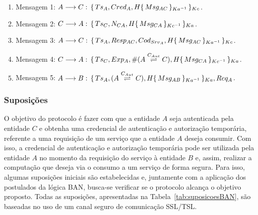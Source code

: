 \begin{enumerate}
  \item Mensagem 1: ${A}\longrightarrow{C}:\,{\{\,{Ts_A,Cred_A,H{\{\,{Msg_{AC}}\,\}_{Ka ^{-1}}}}\,\}_{Kc}}$.
  \item Mensagem 2: ${C}\longrightarrow{A}:\,{\{\,{Ts_C,{N_{CA}},H{\{\,{Msg_{CA}}\,\}_{Kc ^{-1}}}}\,\}_{Ka}}$.
  \item Mensagem 3: ${A}\longrightarrow{C}:\,{\{\,{Ts_A,{Resp_{AC}},Cod_{Srv_A},H{\{\,{Msg_{AC}}\,\}_{Ka ^{-1}}}}\,\}_{Kc}}$.
  \item Mensagem 4: ${C}\longrightarrow{A}:\,{\{\,{Ts_C,Exp_A,\#({A}\stackrel{{C_{Aut}}}{\rightleftharpoons}{C}),H{\{\,{Msg_{CA}}\,\}_{Kc ^{-1}}}}\,\}_{Ka}}$.
  \item Mensagem 5: ${A}\longrightarrow{B}:\,{\{\,{Ts_A,({A}\stackrel{{C_{Aut}}}{\rightleftharpoons}{C}),H{\{\,{Msg_{AB}}\,\}_{Ka ^{-1}}}}\,\}_{Ka}},{Req_A}$.

\end{enumerate}

\subsubsection{Suposições}\label{sec:Suposicoes}

O objetivo do protocolo é fazer com que a entidade ${A}$ seja autenticada pela entidade ${C}$ e obtenha uma credencial de autenticação e autorização temporária, referente a uma requisição de um serviço que a entidade ${A}$ deseja consumir. Com isso, a credencial de autenticação e autorização temporária pode ser utilizada pela entidade ${A}$ no momento da requisição do serviço à entidade ${B}$ e, assim, realizar a computação que deseja via o consumo a um serviço de forma segura. Para isso, algumas suposições iniciais são estabelecidas e, juntamente com a aplicação dos postulados da lógica BAN, busca-se verificar se o protocolo alcança o objetivo proposto. Todas as suposições, apresentadas na Tabela~\ref{tab:suposicoesBAN}, são baseadas no uso de um canal seguro de comunicação SSL/TSL. %

